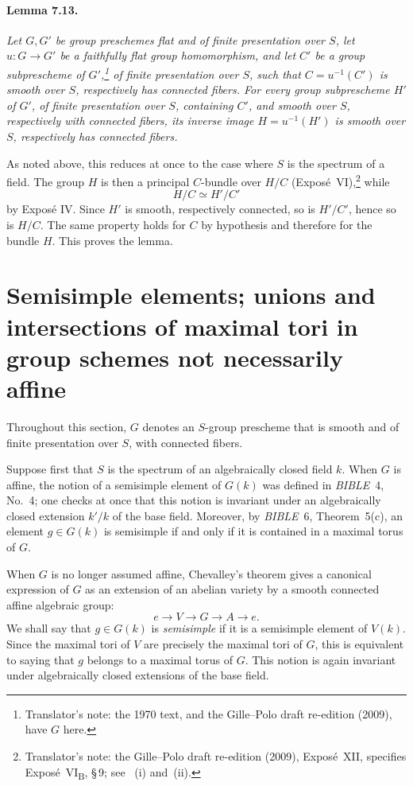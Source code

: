 \paragraph{\textbf{Lemma 7.13.}}
\emph{Let \(G,G'\) be group preschemes flat and of finite
presentation over \(S\), let \(u:G\to G'\) be a faithfully flat
group homomorphism, and let \(C'\) be a group subprescheme of \(G'\),\footnote{Translator's
note: the 1970 text, and the Gille--Polo draft re-edition (2009), have \(G\)
here.}
of finite presentation over \(S\), such that
\(C=u^{-1}(C')\) is smooth over \(S\), respectively has connected
fibers. For every group subprescheme \(H'\) of \(G'\), of finite
presentation over \(S\), containing \(C'\), and smooth over \(S\),
respectively with connected fibers, its inverse image
\(H=u^{-1}(H')\) is smooth over \(S\), respectively has connected
fibers.}

As noted above, this reduces at once to the case where \(S\) is the
spectrum of a field. The group \(H\) is then a principal \(C\)-bundle
over \(H/C\) (Exposé~VI),\footnote{Translator's note: the Gille--Polo draft
re-edition (2009), Exposé~XII, specifies Exposé~VI\textsubscript{B}, \S\,9; see
~(i) and~(ii).} while
\[
  H/C\simeq H'/C'
\]
by Exposé IV. Since \(H'\) is smooth, respectively connected, so is
\(H'/C'\), hence so is \(H/C\). The same property holds for \(C\) by
hypothesis and therefore for the bundle \(H\). This proves the
lemma.

\section{Semisimple elements; unions and intersections of maximal
tori in group schemes not necessarily affine}

Throughout this section, \(G\) denotes an \(S\)-group prescheme that
is smooth and of finite presentation over \(S\), with connected
fibers.

Suppose first that \(S\) is the spectrum of an algebraically closed
field \(k\). When \(G\) is affine, the notion of a semisimple element
of \(G(k)\) was defined in \emph{BIBLE}~4, No.~4; one checks at once
that this notion is invariant under an algebraically closed extension
\(k'/k\) of the base field. Moreover, by \emph{BIBLE}~6,
Theorem~5(c), an element \(g\in G(k)\) is semisimple if and only if
it is contained in a maximal torus of \(G\).

When \(G\) is no longer assumed affine, Chevalley's theorem gives a
canonical expression of \(G\) as an extension of an abelian variety
by a smooth connected affine algebraic group:
\begin{equation}
\tag{*}\label{sga3:xii:lemma:7-13:equation:star}
  e\longrightarrow V\longrightarrow G\longrightarrow A
  \longrightarrow e.
\end{equation}
We shall say that \(g\in G(k)\) is \emph{semisimple} if it is a
semisimple element of \(V(k)\). Since the maximal tori of \(V\) are
precisely the maximal tori of \(G\), this is equivalent to saying
that \(g\) belongs to a maximal torus of \(G\). This notion is again
invariant under algebraically closed extensions of the base field.

